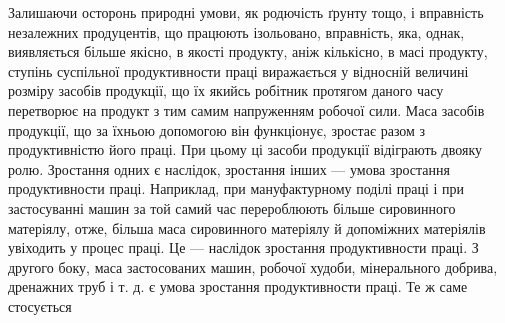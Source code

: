 Залишаючи осторонь природні умови, як родючість ґрунту
тощо, і вправність незалежних продуцентів, що працюють ізольовано,
вправність, яка, однак, виявляється більше якісно, в якості
продукту, аніж кількісно, в масі продукту, ступінь суспільної
продуктивности праці виражається у відносній величині розміру
засобів продукції, що їх якийсь робітник протягом даного часу
перетворює на продукт з тим самим напруженням робочої сили.
Маса засобів продукції, що за їхньою допомогою він функціонує,
зростає разом з продуктивністю його праці. При цьому ці засоби
продукції відіграють двояку ролю. Зростання одних є наслідок,
зростання інших — умова зростання продуктивности праці.
Наприклад, при мануфактурному поділі праці і при застосуванні
машин за той самий час перероблюють більше сировинного матеріялу,
отже, більша маса сировинного матеріялу й допоміжних
матеріялів увіходить у процес праці. Це — наслідок зростання
продуктивности праці. З другого боку, маса застосованих машин,
робочої худоби, мінерального добрива, дренажних труб і т. д.
є умова зростання продуктивности праці. Те ж саме стосується
\parbreak{}  %
